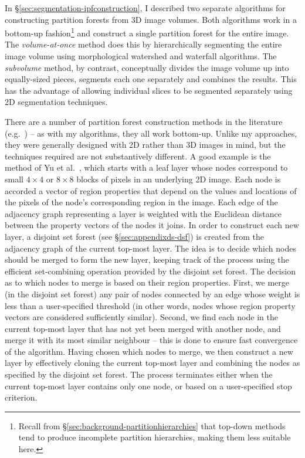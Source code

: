 In \S\ref{sec:segmentation-ipfconstruction}, I described two separate algorithms for constructing partition forests from 3D image volumes. Both algorithms work in a bottom-up fashion\footnote{Recall from \S\ref{sec:background-partitionhierarchies} that top-down methods tend to produce incomplete partition hierarchies, making them less suitable here.} and construct a single partition forest for the entire image. The \emph{volume-at-once} method does this by hierarchically segmenting the entire image volume using morphological watershed and waterfall algorithms. The \emph{subvolume} method, by contrast, conceptually divides the image volume up into equally-sized pieces, segments each one separately and combines the results. This has the advantage of allowing individual slices to be segmented separately using 2D segmentation techniques.

There are a number of partition forest construction methods in the literature (e.g.~\cite{yu02,marfil07}) -- as with my algorithms, they all work bottom-up. Unlike my approaches, they were generally designed with 2D rather than 3D images in mind, but the techniques required are not substantively different. A good example is the method of Yu et al.\ \cite{yu02}, which starts with a leaf layer whose nodes correspond to small $4 \times 4$ or $8 \times 8$ blocks of pixels in an underlying 2D image. Each node is accorded a vector of region properties that depend on the values and locations of the pixels of the node's corresponding region in the image. Each edge of the adjacency graph representing a layer is weighted with the Euclidean distance between the property vectors of the nodes it joins. In order to construct each new layer, a disjoint set forest (see \S\ref{sec:appendixds-dsf}) is created from the adjacency graph of the current top-most layer. The idea is to decide which nodes should be merged to form the new layer, keeping track of the process using the efficient set-combining operation provided by the disjoint set forest. The decision as to which nodes to merge is based on their region properties. First, we merge (in the disjoint set forest) any pair of nodes connected by an edge whose weight is less than a user-specified threshold (in other words, nodes whose region property vectors are considered sufficiently similar). Second, we find each node in the current top-most layer that has not yet been merged with another node, and merge it with its most similar neighbour -- this is done to ensure fast convergence of the algorithm. Having chosen which nodes to merge, we then construct a new layer by effectively cloning the current top-most layer and combining the nodes as specified by the disjoint set forest. The process terminates either when the current top-most layer contains only one node, or based on a user-specified stop criterion.

